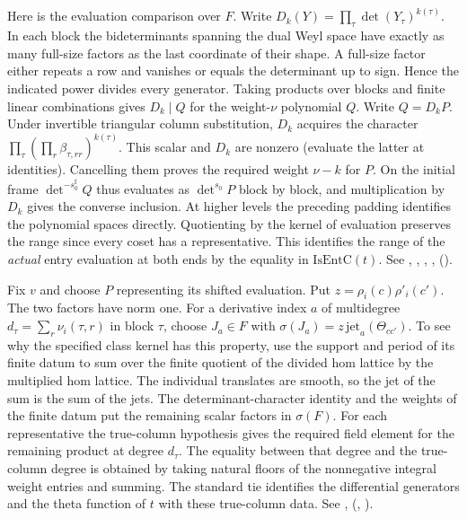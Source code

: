 Here is the evaluation comparison over $F$. Write
$D_k(Y)=\prod_\tau\det(Y_\tau)^{k(\tau)}$. In each block the
bideterminants spanning the dual Weyl space have exactly as many
full-size factors as the last coordinate of their shape. A full-size
factor either repeats a row and vanishes or equals the determinant
up to sign. Hence the indicated power divides every generator.
Taking products over blocks and finite linear combinations gives
$D_k\mid Q$ for the weight-$\nu$ polynomial $Q$. Write $Q=D_kP$.
Under invertible triangular column substitution, $D_k$ acquires
the character $\prod_\tau(\prod_r\beta_{\tau,rr})^{k(\tau)}$.
This scalar and $D_k$ are nonzero (evaluate the latter at identities).
Cancelling them proves the required weight $\nu-k$ for $P$.
On the initial frame $\det^{-s^\sharp_0}Q$ thus evaluates as
$\det^{s_0}P$ block by block, and multiplication by $D_k$ gives
the converse inclusion. At higher levels the preceding padding
identifies the polynomial spaces directly. Quotienting by the kernel
of evaluation preserves the range since every coset has a
representative. This identifies the range of the \emph{actual} entry
evaluation at both ends by the equality in $\mathrm{IsEntC}(t)$.
See , ,
, ,
().

Fix $v$ and choose $P$ representing its shifted evaluation. Put
$z=\rho_i(c)\rho'_i(c')$. The two factors have norm one.
For a derivative index $a$ of multidegree
$d_\tau=\sum_r\nu_i(\tau,r)$ in block $\tau$, choose $J_a\in F$
with $\sigma(J_a)=z\,\mathrm{jet}_a(\Theta_{cc'})$. To see why the
specified class kernel has this property, use the support and
period of its finite datum to sum over the finite quotient of the
divided hom lattice by the multiplied hom lattice. The individual
translates are smooth, so the jet of the sum is the sum of the jets.
The determinant-character identity and the weights of the finite
datum put the remaining scalar factors in $\sigma(F)$. For each
representative the true-column hypothesis  gives the
required field element for the remaining product at degree $d_\tau$.
The equality between that degree and the true-column degree is obtained
by taking natural floors of the nonnegative integral weight entries
and summing. The standard tie identifies the differential generators
and the theta function of $t$ with these true-column data.
See , 
(,
).

